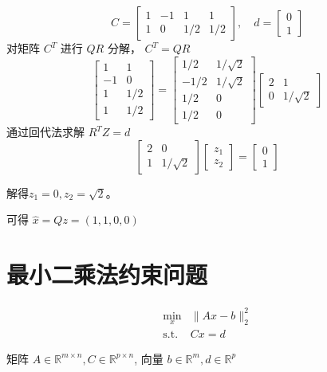 \begin{example}
    $$
C=\left[\begin{array}{cccc}
1 & -1 & 1 & 1 \\
1 & 0 & 1 / 2 & 1 / 2
\end{array}\right], \quad d=\left[\begin{array}{l}
0 \\
1
\end{array}\right]
$$
对矩阵 $ C^{T} $ 进行 $ Q R $ 分解， $ C^{T}=Q R $
$$
\left[\begin{array}{cc}
1 & 1 \\
-1 & 0 \\
1 & 1 / 2 \\
1 & 1 / 2
\end{array}\right]=\left[\begin{array}{cc}
1 / 2 & 1 / \sqrt{2} \\
-1 / 2 & 1 / \sqrt{2} \\
1 / 2 & 0 \\
1 / 2 & 0
\end{array}\right]\left[\begin{array}{cc}
2 & 1 \\
0 & 1 / \sqrt{2}
\end{array}\right]
$$
通过回代法求解 $ R^{T} Z=d $
$$
\left[\begin{array}{cc}
2 & 0 \\
1 & 1 / \sqrt{2}
\end{array}\right]\left[\begin{array}{l}
z_{1} \\
z_{2}
\end{array}\right]=\left[\begin{array}{l}
0 \\
1
\end{array}\right]
$$

解得$
 z_{1}=0, z_{2}=\sqrt{2}
$。

可得 $ \hat{x}=Q z=(1,1,0,0) $
\end{example}

\section{最小二乘法约束问题}

\begin{problem}[分段多项式拟合问题]
    $$\begin{aligned}
        \min _{x} &\|A x-b\|_{2}^{2} \\
        \text{s.t.} & Cx =d 
    \end{aligned}$$

    矩阵 $ {A} \in \mathbb{R}^{m \times n}, {C} \in \mathbb{R}^{p \times n} $, 向量 $ {b} \in \mathbb{R}^{m}, d \in \mathbb{R}^{p} $
\end{problem}


